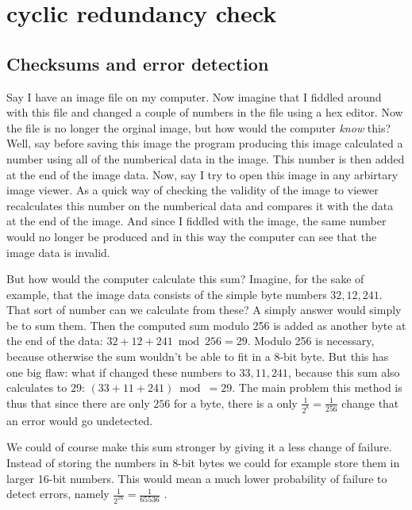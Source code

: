 \begin{comment}
  
\end{comment}

\chapter{cyclic redundancy check}
\label{cha:crc}

\section{Checksums and error detection}

Say I have an image file on my computer. Now imagine that I fiddled
around with this file and changed a couple of numbers in the file
using a hex editor. Now the file is no longer the orginal image, but
how would the computer \textit{know} this? Well, say before saving
this image the program producing this image calculated a number using
all of the numberical data in the image. This number is then added at
the end of the image data. Now, say I try to open this image in any
arbirtary image viewer. As a quick way of checking the validity of the
image to viewer recalculates this number on the numberical data and
compares it with the data at the end of the image. And since I fiddled
with the image, the same number would no longer be produced and in
this way the computer can see that the image data is invalid.

But how would the computer calculate this sum? Imagine, for the sake
of example, that the image data consists of the simple byte numbers
$32,12,241$. That sort of number can we calculate from these? A simply
answer would simply be to sum
them\cite{Williams_1993_crc_painless}. Then the computed sum modulo
256 is added as another byte at the end of the data: $32 + 12 + 241
\bmod 256 = 29$. Modulo 256 is necessary, because otherwise the sum
wouldn't be able to fit in a 8-bit byte. But this has one big flaw:
what if changed these numbers to $33,11,241$, because this sum also
calculates to 29: $(33 + 11 + 241) \bmod = 29$. The main problem this
method is thus that since there are only $256$ for a byte, there is a
only $\frac{1}{2^8} = \frac{1}{256}$ change that an error would go undetected.

We could of course make this sum stronger by giving it a less change
of failure. Instead of storing the numbers in 8-bit bytes we could for
example store them in larger 16-bit numbers. This would mean a much
lower probability of failure to detect errors, namely
$\frac{1}{2^{16}} =
\frac{1}{65536}$ \cite{Williams_1993_crc_painless}.

